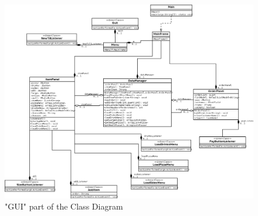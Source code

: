 \documentclass[11pt,a4paper]{article}
\begin{document}
\begin{flushleft}
 \begin{figure}[h]
	\centering
 	\includegraphics[width = 1\textwidth]{../Dia/guiDiagram.png} 
	\caption{"GUI" part of the Class Diagram}
	\label{fig4}
\end{figure}


\end{flushleft}
\end{document}
